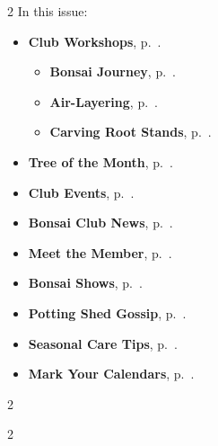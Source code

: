 \setlength{\columnsep}{-5.0cm}
\begin{multicols}{2}
    \noindent\textsf{In this issue:}
    \begin{itemize}
        \item \textsf{\textbf{Club Workshops}}, p.~\pageref{2025-05-marktalk}.
        \begin{itemize}
            \item \textsf{\textbf{Bonsai Journey}}, p.~\pageref{2025-05-marktalk}.
            \item \textsf{\textbf{Air\--Layering}}, p.~\pageref{2025-05-layers}.
            \item \textsf{\textbf{Carving Root Stands}}, p.~\pageref{2025-05-rootstands}.
        \end{itemize}
        \item \textsf{\textbf{Tree of the Month}}, p.~\pageref{2025-05-contest}.
        \item \textsf{\textbf{Club Events}}, p.~\pageref{2025-05-calendar}.
        \item \textsf{\textbf{Bonsai Club News}}, p.~\pageref{2025-05-news}.
        \item \textsf{\textbf{Meet the Member}}, p.~\pageref{2025-05-roots}.
        \item \textsf{\textbf{Bonsai Shows}}, p.~\pageref{2025-05-show}.
        \item \textsf{\textbf{Potting Shed Gossip}}, p.~\pageref{2025-05-gossip}.
        \item \textsf{\textbf{Seasonal Care Tips}}, p.~\pageref{2025-05-care}.
        \item \textsf{\textbf{Mark Your Calendars}}, p.~\pageref{2025-05-events}.
    \end{itemize}
    \vfill\null
    \columnbreak

    
\end{multicols}
\pagebreak

\setlength{\columnsep}{0.5cm}
\begin{multicols}{2}
    
    
    
    
    
    
    
    
\end{multicols}

\begin{multicols}{2}
    
    
    
\end{multicols}
